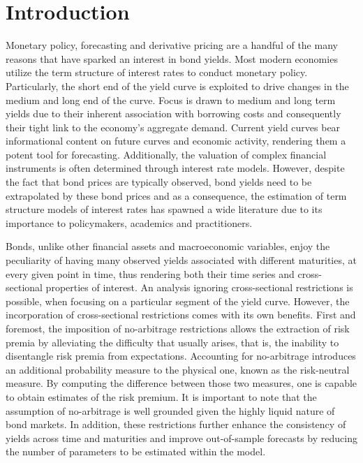 \section{Introduction}

Monetary policy, forecasting and derivative pricing are a handful of the many reasons that have sparked an interest in bond yields. Most modern economies utilize the term structure of interest rates to conduct monetary policy. Particularly, the short end of the yield curve is exploited to drive changes in the medium and long end of the curve. Focus is drawn to medium and long term yields due to their inherent association with borrowing costs and consequently their tight link to the economy's aggregate demand. Current yield curves bear informational content on future curves and economic activity, rendering them a potent tool for forecasting. Additionally, the valuation of complex financial instruments is often determined through interest rate models. However, despite the fact that bond prices are typically observed, bond yields need to be extrapolated by these bond prices and as a consequence, the estimation of term structure models of interest rates has spawned a wide literature due to its importance to policymakers, academics and practitioners. 

Bonds, unlike other financial assets and macroeconomic variables, enjoy the peculiarity of having many observed yields associated with different maturities, at every given point in time, thus rendering both their time series and cross-sectional properties of interest. An analysis ignoring cross-sectional restrictions is possible, when focusing on a particular segment of the yield curve. However, the incorporation of cross-sectional restrictions comes with its own benefits. First and foremost, the imposition of no-arbitrage restrictions allows the extraction of risk premia by alleviating the difficulty that usually arises, that is, the inability to disentangle risk premia from expectations. Accounting for no-arbitrage introduces an additional probability measure to the physical one, known as the risk-neutral measure. By computing the difference between those two measures, one is capable to obtain estimates of the risk premium. It is important to note that the assumption of no-arbitrage is well grounded given the highly liquid nature of bond markets. In addition, these restrictions further enhance the consistency of yields across time and maturities and improve out-of-sample forecasts by reducing the number of parameters to be estimated within the model. 

